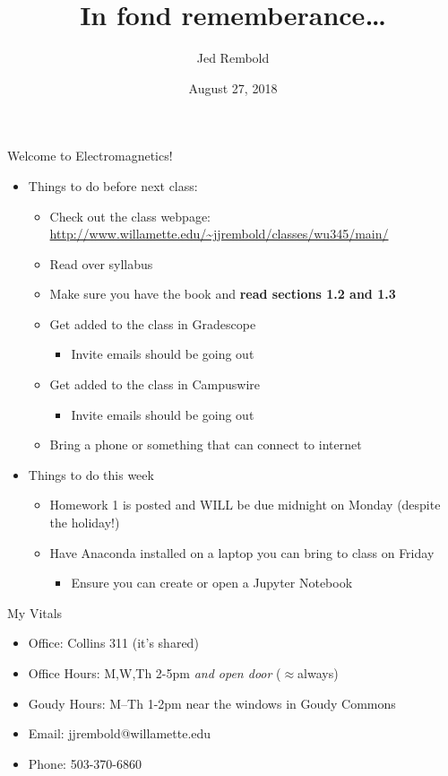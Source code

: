 \documentclass[pdf,aspectratio=169]{beamer}
\title{In fond rememberance\ldots}
\date{August 27, 2018}
\author{Jed Rembold}
\begin{document}
\renewcommand{\theenumi}{\Alph{enumi}}

\begin{frame}{Welcome to Electromagnetics!}
  \begin{itemize}
	  \item Things to do before \alert{next class}:
	  \begin{itemize}
		  \item Check out the class webpage: \url{http://www.willamette.edu/~jjrembold/classes/wu345/main/}
		  \item Read over syllabus
		  \item Make sure you have the book and \textbf{read sections 1.2 and 1.3}
		  \item Get added to the class in Gradescope
			  \begin{itemize}
			  	\item Invite emails should be going out
			  \end{itemize}
		  \item Get added to the class in Campuswire
			  \begin{itemize}
			  	\item Invite emails should be going out
			  \end{itemize}
		  \item Bring a phone or something that can connect to internet 
	  \end{itemize}
  \item Things to do this \alert{week}
	  \begin{itemize}
		  \item Homework 1 is posted and WILL be due midnight on Monday (despite the holiday!)
		  \item Have Anaconda installed on a laptop you can bring to class on Friday
			  \begin{itemize}
			  	\item Ensure you can create or open a Jupyter Notebook
			  \end{itemize}
	  \end{itemize}
  \end{itemize}
\end{frame}

\begin{frame}{My Vitals}
  \begin{itemize}
	\item Office: Collins 311 (it's shared)
	\item Office Hours: M,W,Th 2-5pm \emph{and open door} ($\approx$always)
	\item Goudy Hours: M--Th 1-2pm near the windows in Goudy Commons
	\item Email: jjrembold@willamette.edu
	\item Phone: 503-370-6860
  \end{itemize}
\end{frame}
\end{document}
